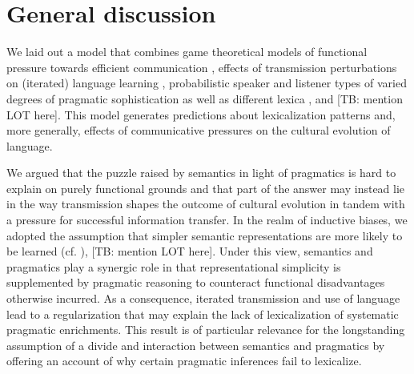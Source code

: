 \documentclass[a4paper]{article}
\newcommand{\tb}[1]{\textcolor[rgb]{.8,.33,.0}{[TB: #1]}}%
\begin{document}
\section{General discussion}\label{sec:discussion}
We laid out a model that combines game theoretical models of functional pressure towards efficient communication \citep{nowak+krakauer:1999}, effects of transmission perturbations on (iterated) language learning \citep{griffiths+kalish:2007}, probabilistic speaker and listener types of varied degrees of pragmatic sophistication \citep{frank+goodman:2012, franke+jaeger:2014} as well as different lexica \citep{bergen+etal:2012,bergen+etal:2016}, and \tb{mention LOT here}. This model generates predictions about lexicalization patterns and, more generally, effects of communicative pressures on the cultural evolution of language. 

We argued that the puzzle raised by semantics in light of pragmatics is hard to explain on purely functional grounds and that part of the answer may instead lie in the way transmission shapes the outcome of cultural evolution in tandem with a pressure for successful information transfer. In the realm of inductive biases, we adopted the assumption that simpler semantic representations are more likely to be learned (cf. \citealt{chater+vitanyi:2003}), \tb{mention LOT here}. Under this view, semantics and pragmatics play a synergic role in that representational simplicity is supplemented by pragmatic reasoning to counteract functional disadvantages otherwise incurred. As a consequence, iterated transmission and use of language lead to a regularization that may explain the lack of lexicalization of systematic pragmatic enrichments. This result is of particular relevance for the longstanding assumption of a divide and interaction between semantics and pragmatics by offering an account of why certain pragmatic inferences fail to lexicalize. 
\end{document}
